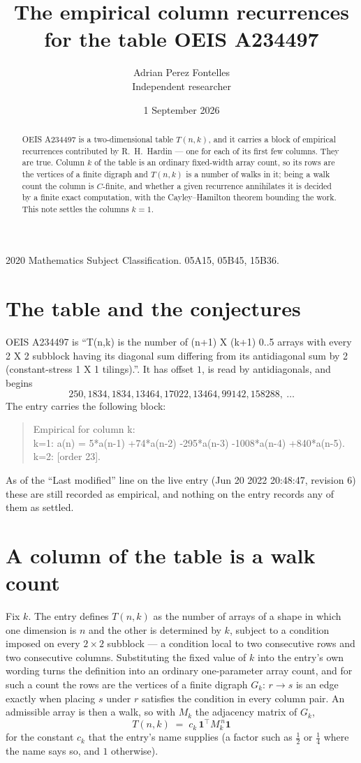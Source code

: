 \documentclass[11pt,a4paper]{article}
\title{The empirical column recurrences for the table OEIS A234497}
\author{Adrian Perez Fontelles\\ \small Independent researcher}
\date{1 September 2026}
\theoremstyle{plain}
\theoremstyle{definition}
\begin{document}
\maketitle

\begin{abstract}
OEIS A234497 is a two-dimensional table $T(n,k)$, and it carries a block of empirical
recurrences contributed by R.~H.~Hardin --- one for each of its first few columns. They are
true. Column $k$ of the table is an ordinary fixed-width array count, so its rows are the
vertices of a finite digraph and $T(n,k)$ is a number of walks in it; being a walk count the
column is $C$-finite, and whether a given recurrence annihilates it is decided by a finite
exact computation, with the Cayley--Hamilton theorem bounding the work. This note settles the columns $k=1$.
\end{abstract}

\noindent\small 2020 Mathematics Subject Classification. 05A15, 05B45, 15B36.\normalsize

\section{The table and the conjectures}

OEIS A234497 is ``T(n,k) is the number of (n+1) X (k+1) 0..5 arrays with every 2 X 2 subblock having its diagonal sum differing from its antidiagonal sum by 2 (constant-stress 1 X 1 tilings).''. It has offset $1$, is
read by antidiagonals, and begins
\[
250, 1834, 1834, 13464, 17022, 13464, 99142, 158288,\ \dots
\]
The entry carries the following block:
\begin{quote}\small
Empirical for column k:\\
k=1: a(n) = 5*a(n-1) +74*a(n-2) -295*a(n-3) -1008*a(n-4) +840*a(n-5).\\
k=2: [order 23].\\
\end{quote}
As of the ``Last modified'' line on the live entry (Jun 20 2022 20:48:47, revision 6) these are still
recorded as empirical, and nothing on the entry records any of them as settled.

\section{A column of the table is a walk count}

Fix $k$. The entry defines $T(n,k)$ as the number of arrays of a shape in which one dimension
is $n$ and the other is determined by $k$, subject to a condition imposed on every
$2\times2$ subblock --- a condition local to two consecutive rows and two consecutive columns.
Substituting the fixed value of $k$ into the entry's own wording turns the definition into an
ordinary one-parameter array count, and for such a count the rows are the vertices of a finite
digraph $G_k$: $r\to s$ is an edge exactly when placing $s$ under $r$ satisfies the condition
in every column pair. An admissible array is then a walk, so with $M_k$ the adjacency matrix
of $G_k$,
\[
T(n,k)\;=\;c_k\,\mathbf{1}^{\!\top}M_k^{\,n}\mathbf{1}
\]
for the constant $c_k$ that the entry's name supplies (a factor such as $\tfrac12$ or
$\tfrac14$ where the name says so, and $1$ otherwise).
\end{document}
